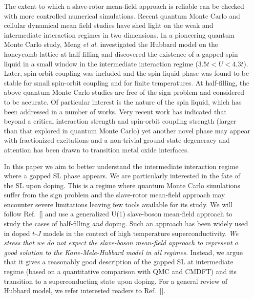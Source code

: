 \documentclass[aps,prb,twocolumn,superscriptaddress,showpacs]{revtex4-1}
\begin{document}
The extent to which a slave-rotor mean-field approach is reliable can be checked with more controlled numerical simulations. Recent quantum Monte Carlo and cellular dynamical mean field studies have shed light on the weak and intermediate interaction regimes in two dimensions.\cite{Meng:nat10,Assaad:prl11,Wu:10,Imada:prb11,Hur:11}
In a pioneering quantum Monte Carlo study, Meng \emph{et al.}\cite{Meng:nat10} investigated the Hubbard model on the honeycomb lattice at half-filling and discovered the existence of a gapped spin liquid in a small window in the intermediate interaction regime ($3.5t< U<4.3t$). Later, spin-orbit coupling was included and the spin liquid phase was found to be stable for small spin-orbit coupling \cite{Assaad:prl11} and for finite temperatures.\cite{Hur:11} At half-filling, the above quantum Monte Carlo studies are free of the sign problem and considered to be accurate. Of particular interest is the nature of the spin liquid, which has been addressed in a number of works.\cite{Wang:prb10,Sondhi:10,Vaezi:10,Lu_10_1,Lu_10_2}  Very recent work has indicated that beyond a critical interaction strength and spin-orbit coupling strength (larger than that explored in quantum Monte Carlo) yet another novel phase may appear with fractionized excitations and a non-trivial ground-state degeneracy\cite{Ruegg11} and attention has been drawn to transition metal oxide interfaces.\cite{Ruegg11_2,Wang11,Yang11,Xiao11}

In this paper we aim to better understand the intermediate interaction regime where a gapped SL phase appears. We are particularly interested in the fate of the SL\cite{Fiete:11} upon doping. This is a regime where quantum Monte Carlo simulations suffer from the sign problem\cite{Troyer:prl05} and the slave-rotor mean-field approach may encounter severe limitations\cite{Georges:prb02} leaving few tools available for its study.  We will follow Ref.~[] and use a generalized U(1) slave-boson mean-field approach to study the cases of half-filling {\em and} doping. Such an approach has been widely used in doped $t$-$J$ models in the context of high temperature superconductivity.\cite{Wen:rmp06}  {\em We stress that we do not expect the slave-boson mean-field approach to represent a good solution to the Kane-Mele-Hubbard model in all regimes.} Instead, we argue that it gives a reasonably good description of the gapped SL at intermediate regime (based on a quantitative comparison with QMC and CMDFT) and its transition to a superconducting state upon doping. For a general review of Hubbard model, we refer interested readers to Ref.~[].
\end{document}
